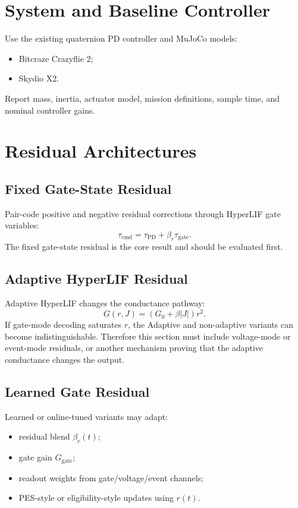 \documentclass[journal]{IEEEtran}
\begin{document}
\section{System and Baseline Controller}
Use the existing quaternion PD controller and MuJoCo models:
\begin{itemize}
  \item Bitcraze Crazyflie 2;
  \item Skydio X2.
\end{itemize}
Report mass, inertia, actuator model, mission definitions, sample time, and nominal controller gains.

\section{Residual Architectures}
\subsection{Fixed Gate-State Residual}
Pair-code positive and negative residual corrections through HyperLIF gate variables:
\begin{equation}
\tau_{\mathrm{cmd}} = \tau_{\mathrm{PD}} + \beta_r \tau_{\mathrm{gate}}.
\end{equation}
The fixed gate-state residual is the core result and should be evaluated first.

\subsection{Adaptive HyperLIF Residual}
Adaptive HyperLIF changes the conductance pathway:
\begin{equation}
G(r,J) = (G_0 + \beta |J|)r^2.
\end{equation}
If gate-mode decoding saturates $r$, the Adaptive and non-adaptive variants can become indistinguishable. Therefore this section must include voltage-mode or event-mode residuals, or another mechanism proving that the adaptive conductance changes the output.

\subsection{Learned Gate Residual}
Learned or online-tuned variants may adapt:
\begin{itemize}
  \item residual blend $\beta_r(t)$;
  \item gate gain $G_{\mathrm{gate}}$;
  \item readout weights from gate/voltage/event channels;
  \item PES-style or eligibility-style updates using $r(t)$.
\end{itemize}
\end{document}
